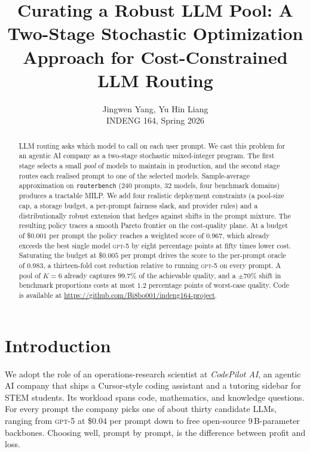 \documentclass[11pt]{article}
\title{Curating a Robust LLM Pool: A Two-Stage Stochastic Optimization Approach for Cost-Constrained LLM Routing}
\author{Jingwen Yang, Yu Hin Liang \\ INDENG 164, Spring 2026}
\date{}
\begin{document}
\maketitle

\begin{abstract}
\small
LLM routing asks which model to call on each user prompt. We cast this problem
for an agentic AI company as a two-stage stochastic mixed-integer program. The
first stage selects a small \emph{pool} of models to maintain in production, and
the second stage routes each realised prompt to one of the selected models.
Sample-average approximation on \texttt{routerbench} (240 prompts, 32 models,
four benchmark domains) produces a tractable MILP. We add four realistic
deployment constraints (a pool-size cap, a storage budget, a per-prompt
fairness slack, and provider rules) and a distributionally robust extension
that hedges against shifts in the prompt mixture. The resulting policy traces
a smooth Pareto frontier on the cost-quality plane. At a budget of \$$0.001$
per prompt the policy reaches a weighted score of $0.967$, which already
exceeds the best single model \textsc{gpt-5} by eight percentage points at
fifty times lower cost. Saturating the budget at \$$0.005$ per prompt drives
the score to the per-prompt oracle of $0.983$, a thirteen-fold cost reduction
relative to running \textsc{gpt-5} on every prompt. A pool of $K=6$ already
captures $99.7\%$ of the achievable quality, and a $\pm 70\%$ shift in
benchmark proportions costs at most $1.2$ percentage points of worst-case
quality. Code is available at
\url{https://github.com/Bi8bo001/indeng164-project}.
\end{abstract}

\section{Introduction}
\label{sec:intro}

We adopt the role of an operations-research scientist at \textit{CodePilot AI},
an agentic AI company that ships a Cursor-style coding assistant and a tutoring
sidebar for STEM students. Its workload spans code, mathematics, and knowledge
questions. For every prompt the company picks one of about thirty candidate
LLMs, ranging from \textsc{gpt-5} at \$$0.04$ per prompt down to free
open-source $9$\,B-parameter backbones. Choosing well, prompt by prompt, is
the difference between profit and loss.
\end{document}
